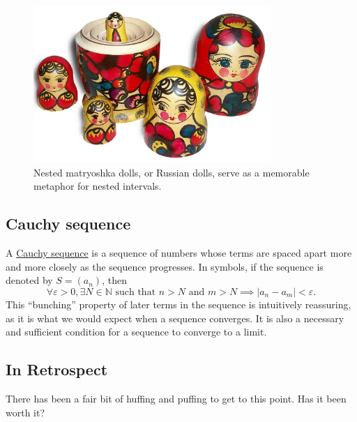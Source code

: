 \documentclass[
  a4paper,
]{article}
\begin{document}
\begin{figure}
\centering
\includegraphics[width=0.8\textwidth,height=\textheight]{images/matryoshka-open.jpg}
\caption[Nested matryoshka dolls, or Russian dolls, serve as a memorable
metaphor for nested intervals.]{Nested matryoshka dolls, or Russian
dolls, serve as a memorable metaphor for nested
intervals.\footnotemark{}}\label{fig:matryoshka}
\end{figure}

\subsection{Cauchy sequence}\label{cauchy-sequence}

A \href{https://en.wikipedia.org/wiki/Cauchy_sequence}{Cauchy sequence}
is a sequence of numbers whose terms are spaced apart more and more
closely as the sequence progresses. In symbols, if the sequence is
denoted by \(S = (a_n)\), then \[
\forall \varepsilon > 0, \exists N \in \mathbb{N} \text{ such that } n > N \text{ and } m > N \implies |a_n - a_m| < \varepsilon.
\] This ``bunching'' property of later terms in the sequence is
intuitively reassuring, as it is what we would expect when a sequence
converges. It is also a necessary and sufficient condition for a
sequence to converge to a limit.

\subsection{In Retrospect}\label{in-retrospect}

There has been a fair bit of huffing and puffing to get to this point.
Has it been worth it?
\end{document}
